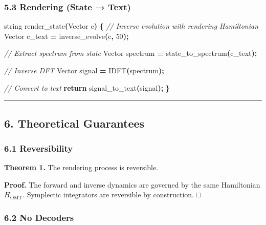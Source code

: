 \documentclass[
  11pt,
  a4paper,
]{article}
\newenvironment{Shaded}{\begin{snugshade}}{\end{snugshade}}
\newcommand{\CommentTok}[1]{\textcolor[rgb]{0.56,0.35,0.01}{\textit{#1}}}
\newcommand{\ControlFlowTok}[1]{\textcolor[rgb]{0.13,0.29,0.53}{\textbf{#1}}}
\newcommand{\DecValTok}[1]{\textcolor[rgb]{0.00,0.00,0.81}{#1}}
\newcommand{\NormalTok}[1]{#1}
\newcommand{\OperatorTok}[1]{\textcolor[rgb]{0.81,0.36,0.00}{\textbf{#1}}}
\begin{document}
\subsubsection{5.3 Rendering (State → Text)}\label{rendering-state-text}

\begin{Shaded}
\begin{Highlighting}[]
\NormalTok{string render\_state}\OperatorTok{(}\NormalTok{Vector c}\OperatorTok{)} \OperatorTok{\{}
    \CommentTok{// Inverse evolution with rendering Hamiltonian}
\NormalTok{    Vector c\_text }\OperatorTok{=}\NormalTok{ inverse\_evolve}\OperatorTok{(}\NormalTok{c}\OperatorTok{,} \DecValTok{50}\OperatorTok{);}
    
    \CommentTok{// Extract spectrum from state}
\NormalTok{    Vector spectrum }\OperatorTok{=}\NormalTok{ state\_to\_spectrum}\OperatorTok{(}\NormalTok{c\_text}\OperatorTok{);}
    
    \CommentTok{// Inverse DFT}
\NormalTok{    Vector signal }\OperatorTok{=}\NormalTok{ IDFT}\OperatorTok{(}\NormalTok{spectrum}\OperatorTok{);}
    
    \CommentTok{// Convert to text}
    \ControlFlowTok{return}\NormalTok{ signal\_to\_text}\OperatorTok{(}\NormalTok{signal}\OperatorTok{);}
\OperatorTok{\}}
\end{Highlighting}
\end{Shaded}

\begin{center}\rule{0.5\linewidth}{0.5pt}\end{center}

\subsection{6. Theoretical Guarantees}\label{theoretical-guarantees}

\subsubsection{6.1 Reversibility}\label{reversibility}

\textbf{Theorem 1.} The rendering process is reversible.

\textbf{Proof.} The forward and inverse dynamics are governed by the
same Hamiltonian \(H_{\text{OMT}}\). Symplectic integrators are
reversible by construction. □

\subsubsection{6.2 No Decoders}\label{no-decoders}
\end{document}
